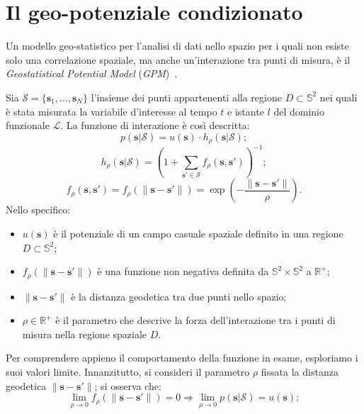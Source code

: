 \section[Il geo-potenziale condizionato]{Il geo-potenziale condizionato}
Un modello geo-statistico per l'analisi di dati nello spazio per i quali non esiste solo una correlazione spaziale, ma anche un'interazione tra punti di misura, è il \textit{Geostatistical Potential Model} (\textit{GPM})~\citep{paper_GPM}.
\par Sia $\mathcal{S} = \{\mathbf{s}_1, \ldots, \mathbf{s}_ N\}$ l'insieme dei punti appartenenti alla regione $D\subset\mathbb{S}^2$ nei quali è stata misurata la variabile d'interesse al tempo $t$ e istante $l$ del dominio funzionale $\mathcal{L}$. La funzione di interazione è così descritta:
\begin{equation}
	p(\mathbf{s} | \mathcal{S}) = u(\mathbf{s}) \cdot h_\rho(\mathbf{s}| \mathcal{S});
	\label{funzione di interazione}
\end{equation}
\begin{equation}
	h_\rho(\mathbf{s}|\mathcal{S}) = \left(1 + \sum_{\mathbf{s}' \in \mathcal{S}} f_\rho(\mathbf{s}, \mathbf{s}')\right)^{-1};
	\label{funzione di interazione_2}
\end{equation}
\begin{equation}
	f_\rho(\mathbf{s}, \mathbf{s}') = f_\rho(\|\mathbf{s} - \mathbf{s}'\|) = \exp\left(-\frac{{\|\mathbf{s} - \mathbf{s}'\|}}{{\rho}}\right).
	\label{nonnegative binary function}
\end{equation}
Nello specifico:
\begin{itemize}
	\item $u(\mathbf{s})$ è il potenziale di un campo casuale spaziale definito in una regione  $D \subset \mathbb{S}^2$;
	\item $f_\rho(\|\mathbf{s} - \mathbf{s}'\|)$ è una funzione non negativa definita da $\mathbb{S}^2\times\mathbb{S}^2$ a $\mathbb{R}^+$;
	\item $\|\mathbf{s} - \mathbf{s}'\|$ è la distanza geodetica tra due punti nello spazio;
	\item $\rho \in \mathbb{R}^+$ è il parametro che descrive la forza dell'interazione tra i punti di misura nella regione spaziale $D$.
\end{itemize}
Per comprendere appieno il comportamento della funzione in esame, esploriamo i suoi valori limite. Innanzitutto, si consideri il parametro $\rho$ fissata la distanza geodetica $\|\mathbf{s} - \mathbf{s}'\|$; si osserva che:
\begin{equation}
	\lim_{\rho \to 0} f_\rho(\|\mathbf{s} - \mathbf{s}'\|) = 0
		 \Rightarrow \lim_{\rho \to 0} p(\mathbf{s}| \mathcal{S}) = u(\mathbf{s}); \label{limite_per_rho_tendente_a_0}
\end{equation}
